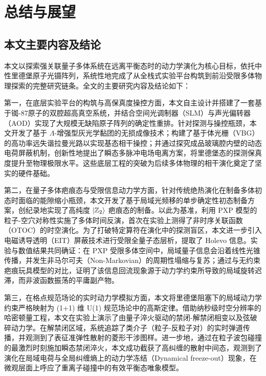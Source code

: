\documentclass[../main.tex]{subfiles}
\begin{document}
\chapter{总结与展望}

\label{ch8:sec:conclusion_outlook}

\section{本文主要内容及结论}
\label{ch8:sec:summary}

本文以探索强关联量子多体系统在远离平衡态时的动力学演化为核心目标，依托中性里德堡原子光镊阵列，系统性地完成了从全栈式实验平台构筑到前沿受限多体物理探索的完整研究链条。全文的主要研究内容及结论如下：

第一，在底层实验平台的构筑与高保真度操控方面，本文自主设计并搭建了一套基于铷-87原子的双腔超高真空系统，并结合空间光调制器（SLM）与声光偏转器（AOD）实现了大规模无缺陷原子阵列的确定性重排。针对探测与操控瓶颈，本文开发了基于 $\Lambda$-增强型灰光学黏团的无损成像技术；构建了基于体光栅（VBG）的高功率远失谐拉曼光路以实现基态相干操控；并通过探究成品玻璃腔内壁的动态电荷屏蔽机制，创新性地提出了瞬态多脉冲电场电离方案，将里德堡态的探测保真度提升至物理极限水平。这些底层工程的突破为后续多体物理的相干演化奠定了坚实的硬件基础。

第二，在量子多体疤痕态与受限信息动力学方面，针对传统绝热演化在制备多体初态时面临的能隙缩小瓶颈，本文开发了基于局域光频移的单步确定性初态制备方案，创纪录地实现了高纯度 $\ket{\mathbb{Z}_2}$ 疤痕态的制备。以此为基准，利用 PXP 模型的粒子-空穴对称性实施了多体时间反演，首次在实验上测得了非时序关联函数（OTOC）的时空演化。为了打破特定算符在演化中的探测盲区，本文进一步引入电磁诱导透明（EIT）屏蔽技术进行受限全量子态层析，提取了 Holevo 信息。实验与数值结果共同确证：在 PXP 受限多体空间中，局域量子信息会沿着线性光锥传播，并发生非马尔可夫（Non-Markovian）的周期性塌缩与复苏；通过与无约束疤痕玩具模型的对比，证明了该信息回流现象源于动力学约束所导致的局域旋转迟滞，而非波函数振荡的平庸副产物。

第三，在格点规范场论的实时动力学模拟方面，本文将里德堡阻塞下的局域动力学约束严格映射为 (1+1) 维 U(1) 规范场论中的高斯定律。借助纳秒级时空分辨率的哈密顿量工程，本文在实验上演示了由量子淬火驱动的禁闭-解禁闭相变以及弦破碎动力学。在解禁闭区域，系统追踪了类介子（粒子-反粒子对）的实时弹道传播，并观测到了表征准弹性散射的菱形干涉图样。进一步地，通过在粒子波包碰撞的最激烈时刻施加瞬态禁闭淬火，本文成功截获了高纠缠的散射中间态，观测到了演化在局域电荷与全局纠缠熵上的动力学冻结（Dynamical freeze-out）现象，在微观层面上呼应了重离子碰撞中的有效平衡态唯象模型。
\end{document}
